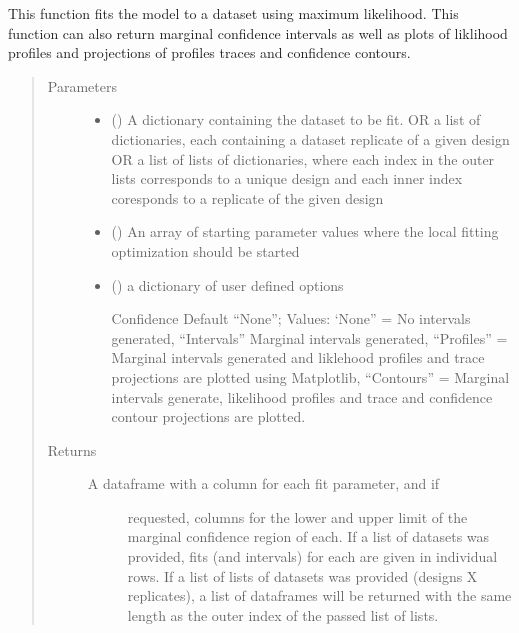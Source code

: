 \documentclass[letterpaper,10pt,english,openany,oneside]{sphinxmanual}
\begin{document}
\begin{fulllineitems}
\begin{fulllineitems}
This function fits the model to a dataset using maximum likelihood. This function can also
return marginal confidence intervals as well as plots of liklihood profiles and projections
of profiles traces and confidence contours.
\begin{quote}\begin{description}
\item[{Parameters}] \leavevmode\begin{itemize}
\item {} 
 (\sphinxstyleliteralemphasis{\sphinxupquote{, }}) \textendash{} A dictionary containing the dataset to be fit.
OR a list of dictionaries, each containing a dataset replicate of a given design
OR a list of lists of dictionaries, where each index in the outer lists corresponds
to a unique design and each inner index coresponds to a replicate of the given design

\item {} 
 (\sphinxstyleliteralemphasis{\sphinxupquote{, }}) \textendash{} An array of starting parameter values where the
local fitting optimization should be started

\item {} 
 (\sphinxstyleliteralemphasis{\sphinxupquote{, }}) \textendash{} 
a dictionary of user defined options

Confidence \sphinxhyphen{} Default “None”; Values: ‘None” = No intervals generated, “Intervals” \sphinxhyphen{}
Marginal intervals generated, “Profiles” = Marginal intervals generated and liklehood
profiles and trace projections are plotted using Matplotlib, “Contours” = Marginal
intervals generate, likelihood profiles and trace and confidence contour projections
are plotted.


\end{itemize}

\item[{Returns}] \leavevmode
\begin{description}
\item[{A dataframe with a column for each fit parameter, and if}] \leavevmode
requested, columns for the lower and upper limit of the marginal confidence region
of each. If a list of datasets was provided, fits (and intervals) for each are given
in individual rows. If a list of lists of datasets was provided (designs X replicates),
a list of dataframes will be returned with the same length as the outer index of the
passed list of lists.


\end{description}
\end{description}
\end{quote}
\end{fulllineitems}
\end{fulllineitems}
\end{document}
